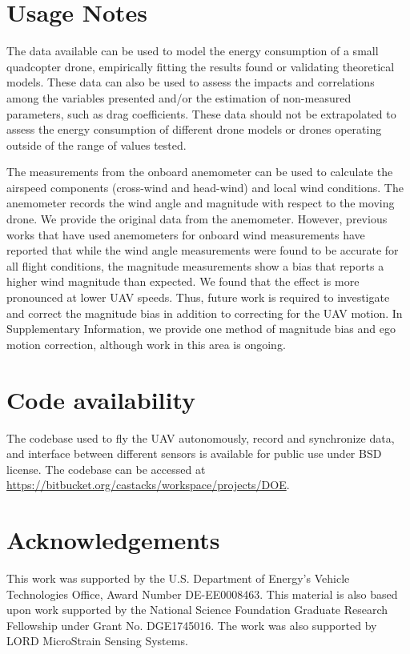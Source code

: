 \documentclass[fleqn,10pt]{wlscirep}
\begin{document}
\section*{Usage Notes}
The data available can be used to model the energy consumption of a small quadcopter drone, empirically fitting the results found or validating theoretical models. These data can also be used to assess the impacts and correlations among the variables presented and/or the estimation of non-measured parameters, such as drag coefficients. These data should not be extrapolated to assess the energy consumption of different drone models or drones operating outside of the range of values tested.

The measurements from the onboard anemometer can be used to calculate the airspeed components (cross-wind and head-wind) and local wind conditions. The anemometer records the wind angle and magnitude with respect to the moving drone. We provide the original data from the anemometer. However, previous works that have used anemometers for onboard wind measurements \cite{garibaldi2010uav,bruschi2016wind,thorpe2018measurement} have reported that while the wind angle measurements were found to be accurate for all flight conditions, the magnitude measurements show a bias that reports a higher wind magnitude than expected. We found that the effect is more pronounced at lower UAV speeds. Thus, future work is required to investigate and correct the magnitude bias in addition to correcting for the UAV motion. In Supplementary Information, we provide one method of magnitude bias and ego motion correction, although work in this area is ongoing. 

\section*{Code availability}
The codebase used to fly the UAV autonomously, record and synchronize data, and interface between different sensors is available for public use under BSD license. The codebase can be accessed at \href{https://bitbucket.org/castacks/workspace/projects/DOE}{https://bitbucket.org/castacks/workspace/projects/DOE}. 



\section*{Acknowledgements} 
This work was supported by the U.S. Department of Energy’s Vehicle Technologies Office, Award Number DE-EE0008463. This material is also based upon work supported by the National Science Foundation Graduate Research Fellowship under Grant No. DGE1745016. The work was also supported by LORD MicroStrain Sensing Systems.
\end{document}
